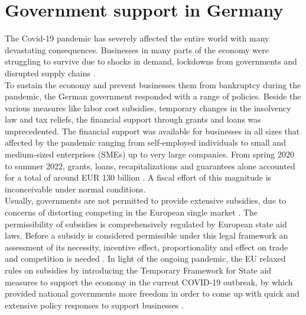 
\chapter{Government support in Germany} %

\label{ChapterX} %




The Covid-19 pandemic has severely affected the entire world with many devastating consequences. Businesses in many parts of the economy were struggling to survive due to shocks in demand, lockdowns from governments and disrupted supply chains \parencite{eu_com_temporary_2020}.\\

To sustain the economy and prevent businesses them from bankruptcy during the pandemic, the German government responded with a range of policies. Beside the various measures like labor cost subsidies, temporary changes in the insolvency law and tax reliefs, the financial support through grants and loans was unprecedented. The financial support was available for businesses in all sizes that affected by the pandemic ranging from self-employed individuals to small and medium-sized enterprises (SMEs) up to very large companies. From spring 2020 to summer 2022, grants, loans, recapitalizations and guarantees alone accounted for a total of around EUR 130 billion \parencite{bmwk_uberblickspapier_2022}. A fiscal effort of this magnitude is inconceivable under normal conditions.\\

Usually, governments are not permitted to provide extensive subsidies, due to concerns of distorting competing in the European single market \parencite{claici_european_2022}. The permissibility of subsidies is comprehensively regulated by European state aid laws. Before a subsidy is considered permissible under this legal framework an assessment of its necessity, incentive effect, proportionality and effect on trade and competition is needed \parencite{claici_european_2022}. In light of the ongoing pandemic, the EU relaxed rules on subsidies by introducing the Temporary Framework for State aid measures to support the economy in the current COVID-19 outbreak, by which provided national governments more freedom in order to come up with quick and extensive policy responses to support businesses \parencite{eu_com_temporary_2020}.\\

